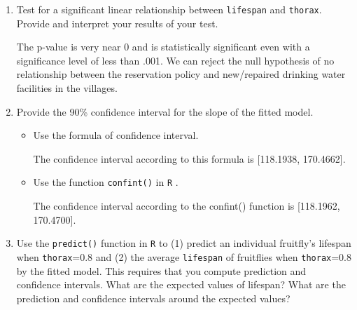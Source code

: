 \documentclass[12pt,letterpaper]{article}
\begin{document}
\begin{enumerate}
	\item
	Test for a significant linear relationship between  \texttt{lifespan} and \texttt{thorax}. Provide and interpret your results of your test.
	\vspace{.2cm}
	


The p-value is very near 0 and is statistically significant even with a significance level of less than .001. We can reject the null hypothesis of no relationship between the reservation policy and new/repaired drinking water facilities in the villages.
	\vspace{1cm}
	
	\item
	
	Provide the 90\% confidence interval for the slope of the fitted model.
			\vspace{.2cm}
			
	\begin{itemize}
		\item
		Use the formula of confidence interval.	
			\vspace{.2cm}	
		


The confidence interval according to this formula is [118.1938, 170.4662].
		\vspace{.5cm}
		
		\item
		Use the function  \texttt{confint()}  in \texttt{R} .
			\vspace{.2cm}
		


The confidence interval according to the confint() function is [118.1962, 170.4700].
		
	\end{itemize}
			\vspace{1cm}
			
	\item Use the \texttt{predict()} function in \texttt{R} to (1) predict an individual fruitfly's lifespan when \texttt{thorax}=0.8 and (2) the average \texttt{lifespan} of fruitflies when \texttt{thorax}=0.8 by the fitted model. This requires that you compute prediction and confidence intervals. What are the expected values of lifespan? What are the prediction and confidence intervals around the expected values? 
		\vspace{.2cm}
	

\end{enumerate}
\end{document}
